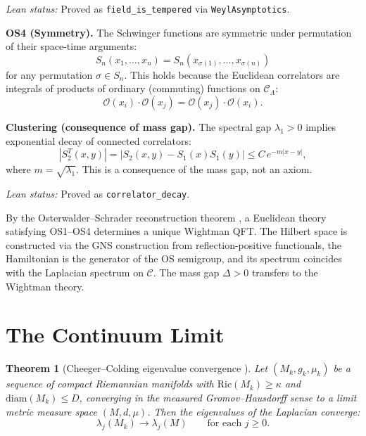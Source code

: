 \documentclass[11pt]{article}
\newtheorem{theorem}{Theorem}[section]
\theoremstyle{definition}
\newcommand{\calC}{\mathcal{C}}
\newcommand{\Ric}{\mathrm{Ric}}
\begin{document}
\textit{Lean status:} Proved as \texttt{field\_is\_tempered} via \texttt{WeylAsymptotics}.

\medskip
\noindent\textbf{OS4 (Symmetry).}
The Schwinger functions are symmetric under permutation of their space-time arguments:
\begin{equation}
    S_n(x_1, \ldots, x_n) = S_n(x_{\sigma(1)}, \ldots, x_{\sigma(n)})
\end{equation}
for any permutation $\sigma \in S_n$. This holds because the Euclidean correlators are integrals of products of ordinary (commuting) functions on $\calC_\Lambda$:
\begin{equation}
    \mathcal{O}(x_i) \cdot \mathcal{O}(x_j) = \mathcal{O}(x_j) \cdot \mathcal{O}(x_i).
\end{equation}

\medskip
\noindent\textbf{Clustering (consequence of mass gap).}
The spectral gap $\lambda_1 > 0$ implies exponential decay of connected correlators:
\begin{equation}
    |S_2^T(x, y)| = |S_2(x,y) - S_1(x)S_1(y)| \leq C\, e^{-m|x-y|},
\end{equation}
where $m = \sqrt{\lambda_1}$. This is a consequence of the mass gap, not an axiom.

\textit{Lean status:} Proved as \texttt{correlator\_decay}.

\medskip
By the Osterwalder--Schrader reconstruction theorem \cite{OS73, OS75}, a Euclidean theory satisfying OS1--OS4 determines a unique Wightman QFT. The Hilbert space is constructed via the GNS construction from reflection-positive functionals, the Hamiltonian is the generator of the OS semigroup, and its spectrum coincides with the Laplacian spectrum on $\calC$. The mass gap $\Delta > 0$ transfers to the Wightman theory.


\section{The Continuum Limit}
\label{sec:continuum}

\begin{theorem}[Cheeger--Colding eigenvalue convergence \cite{CC97}]\label{thm:eigenvalue-convergence}
Let $(M_k, g_k, \mu_k)$ be a sequence of compact Riemannian manifolds with $\Ric(M_k) \geq \kappa$ and $\mathrm{diam}(M_k) \leq D$, converging in the measured Gromov--Hausdorff sense to a limit metric measure space $(M, d, \mu)$. Then the eigenvalues of the Laplacian converge:
\begin{equation}
    \lambda_j(M_k) \to \lambda_j(M) \qquad \text{for each } j \geq 0.
\end{equation}
\end{theorem}
\end{document}
